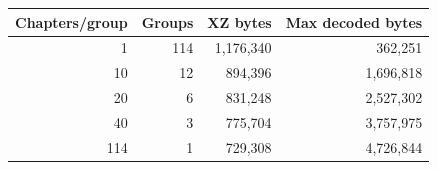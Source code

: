\begin{center}\begin{tabular}{rrrr}\toprule
Chapters/group & Groups & XZ bytes & Max decoded bytes\\\midrule
1 & 114 & 1,176,340 & 362,251\\
10 & 12 & 894,396 & 1,696,818\\
20 & 6 & 831,248 & 2,527,302\\
40 & 3 & 775,704 & 3,757,975\\
114 & 1 & 729,308 & 4,726,844\\
\bottomrule\end{tabular}\end{center}
